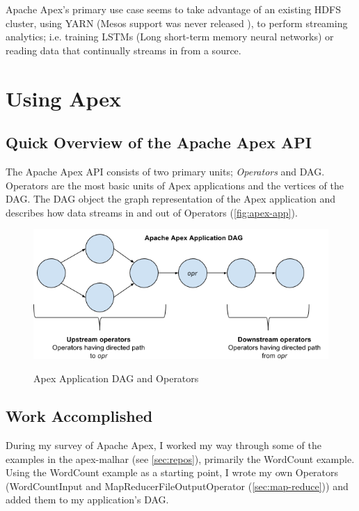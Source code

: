 \documentclass[final]{IEEEtran}
\begin{document}
Apache Apex's primary use case seems to take advantage of an existing HDFS cluster, using YARN (Mesos support was never released \cite{APEX-JIRA}), to perform streaming analytics; i.e. training LSTMs (Long short-term memory neural networks) or reading data that continually streams in from a source.

\section{Using Apex}
\subsection{Quick Overview of the Apache Apex API} \label{sec:overview}
The Apache Apex API consists of two primary units; \emph{Operators} and DAG. Operators are the most basic units of Apex applications and the vertices of the DAG. The DAG object the graph representation of the Apex application and describes how data streams in and out of Operators (\autoref{fig:apex-app})\cite{APEX-DOCS}.

\begin{figure}
  \includegraphics[scale=.4]{../images/apex-dag}
  \caption{Apex Application DAG and Operators}\cite{APEX-DOCS}
  \label{fig:apex-app}
  \centering
\end{figure}

\subsection{Work Accomplished}
During my survey of Apache Apex, I worked my way through some of the examples in the apex-malhar (see \ref{sec:repos}), primarily the WordCount example. Using the WordCount example as a starting point, I wrote my own Operators (WordCountInput and MapReducerFileOutputOperator (\ref{sec:map-reduce})) and added them to my application's DAG.
\end{document}
